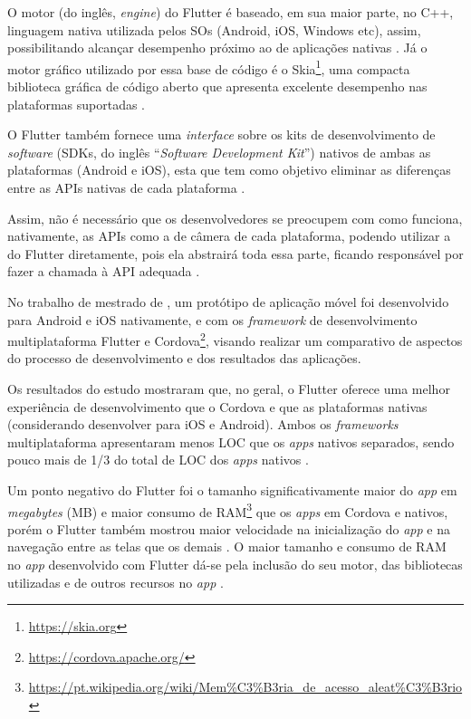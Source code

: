 O motor (do inglês, \emph{engine}) do Flutter é baseado, em sua maior parte, no C++, linguagem nativa utilizada pelos SOs (Android, iOS, Windows etc), assim, possibilitando alcançar desempenho próximo ao de aplicações nativas \cite{zammetti2019practical,kuzmin2020experience}. Já o motor gráfico utilizado por essa base de código é o Skia\footnote{\url{https://skia.org}}, uma compacta biblioteca gráfica de código aberto que apresenta excelente desempenho nas plataformas suportadas \cite{zammetti2019practical,boukhary2019clean}.

O Flutter também fornece uma \emph{interface} sobre os kits de desenvolvimento de \emph{software} (SDKs, do inglês ``\emph{Software Development Kit}'')
nativos de ambas as plataformas (Android e iOS), esta que tem como objetivo eliminar as diferenças entre as APIs nativas de cada plataforma \cite{zammetti2019practical}.

Assim, não é necessário que os desenvolvedores se preocupem com como funciona, nativamente, as APIs como a de câmera de cada plataforma, podendo utilizar a do Flutter diretamente, pois ela abstrairá toda essa parte, ficando responsável por fazer a chamada à API adequada \cite{zammetti2019practical}.

No trabalho de mestrado de , um protótipo de aplicação móvel foi desenvolvido para Android e iOS nativamente, e com os
\emph{framework} de desenvolvimento multiplataforma Flutter e Cordova\footnote{\url{https://cordova.apache.org/}}, visando realizar um comparativo de
aspectos do processo de desenvolvimento e dos resultados das aplicações. 

Os resultados do estudo mostraram que, no geral, o Flutter oferece uma melhor experiência de desenvolvimento que o Cordova e que as plataformas nativas
(considerando desenvolver para iOS e Android). Ambos os \emph{frameworks} multiplataforma apresentaram menos LOC que os \emph{apps} nativos separados,
sendo pouco mais de 1/3 do total de LOC dos \emph{apps} nativos \cite{gonsalves2019evaluating}.

Um ponto negativo do Flutter foi o tamanho significativamente maior do \emph{app} em \emph{megabytes} (MB) e maior consumo de RAM\footnote{\url{https://pt.wikipedia.org/wiki/Mem\%C3\%B3ria_de_acesso_aleat\%C3\%B3rio}}
que os \emph{apps} em Cordova e nativos, porém o Flutter também mostrou maior velocidade na inicialização do \emph{app} e na navegação entre as telas
que os demais \cite{gonsalves2019evaluating}. O maior tamanho e consumo de RAM no \emph{app} desenvolvido com Flutter dá-se pela inclusão do seu motor, das bibliotecas utilizadas e de outros recursos no \emph{app} \cite{gonsalves2019evaluating,zammetti2019practical}.

